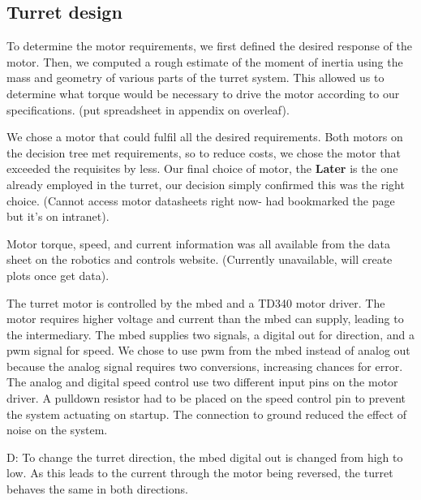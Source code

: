 ﻿\subsection{Turret design}

To determine the motor requirements, we first defined the desired response of the motor. Then, we computed a rough estimate of the moment of inertia using the mass and geometry of various parts of the turret system. This allowed us to determine what torque would be necessary to drive the motor according to our specifications. (put spreadsheet in appendix on overleaf).

We chose a motor that could fulfil all the desired requirements. Both motors on the decision tree met requirements, so to reduce costs, we chose the motor that exceeded the requisites by less. Our final choice of motor, the \textbf{Later} is the one already employed in the turret, our decision simply confirmed this was the right choice. (Cannot access motor datasheets right now- had bookmarked the page but it’s on intranet). %

Motor torque, speed, and current information was all available from the data sheet on the robotics and controls website. (Currently unavailable, will create plots once get data).

The turret motor is controlled by the mbed and a TD340 motor driver. The motor requires higher voltage and current than the mbed can supply, leading to the intermediary. The mbed supplies two signals, a digital out for direction, and a pwm signal for speed. We chose to use pwm from the mbed instead of analog out because the analog signal requires two conversions, increasing chances for error. The analog and digital speed control use two different input pins on the motor driver. A pulldown resistor had to be placed on the speed control pin to prevent the system actuating on startup. The connection to ground reduced the effect of noise on the system.

D: To change the turret direction, the mbed digital out is changed from high to low. As this leads to the current through the motor being reversed, the turret behaves the same in both directions.